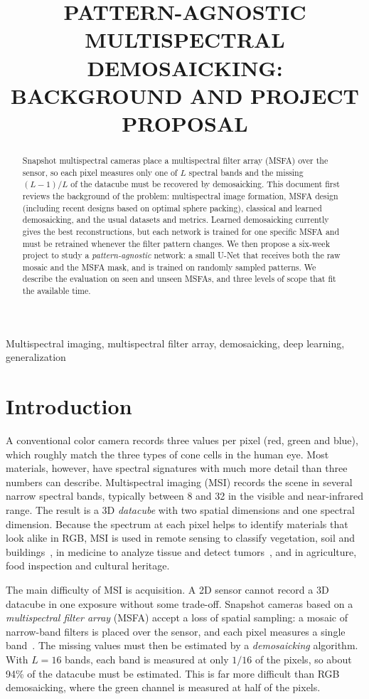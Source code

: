 \documentclass{article}
\title{PATTERN-AGNOSTIC MULTISPECTRAL DEMOSAICKING:\\
  BACKGROUND AND PROJECT PROPOSAL}
\begin{document}
%
\maketitle
%
\begin{abstract}
Snapshot multispectral cameras place a multispectral filter array (MSFA) over
the sensor, so each pixel measures only one of $L$ spectral bands and the
missing $(L-1)/L$ of the datacube must be recovered by demosaicking. This
document first reviews the background of the problem: multispectral image
formation, MSFA design (including recent designs based on optimal sphere
packing), classical and learned demosaicking, and the usual datasets and
metrics. Learned demosaicking currently gives the best reconstructions, but
each network is trained for one specific MSFA and must be retrained whenever
the filter pattern changes. We then propose a six-week project to study a
\emph{pattern-agnostic} network: a small U-Net that receives both the raw
mosaic and the MSFA mask, and is trained on randomly sampled patterns. We
describe the evaluation on seen and unseen MSFAs, and three levels of scope
that fit the available time.
\end{abstract}
%
\begin{keywords}
Multispectral imaging, multispectral filter array, demosaicking, deep
learning, generalization
\end{keywords}
%
\section{Introduction}
\label{sec:intro}

A conventional color camera records three values per pixel (red, green and
blue), which roughly match the three types of cone cells in the human eye.
Most materials, however, have spectral signatures with much more detail than
three numbers can describe. Multispectral imaging (MSI) records the scene in
several narrow spectral bands, typically between 8 and 32 in the visible and
near-infrared range. The result is a 3D \emph{datacube} with two spatial
dimensions and one spectral dimension. Because the spectrum at each pixel
helps to identify materials that look alike in RGB, MSI is used in remote
sensing to classify vegetation, soil and buildings~\cite{diaz2023}, in
medicine to analyze tissue and detect tumors~\cite{lu2014}, and in
agriculture, food inspection and cultural heritage.

The main difficulty of MSI is acquisition. A 2D sensor cannot record a 3D
datacube in one exposure without some trade-off. Snapshot cameras based on a
\emph{multispectral filter array} (MSFA) accept a loss of spatial sampling: a
mosaic of narrow-band filters is placed over the sensor, and each pixel
measures a single band~\cite{lapray2014}. The missing values must then be
estimated by a \emph{demosaicking} algorithm. With $L=16$ bands, each band is
measured at only $1/16$ of the pixels, so about 94\% of the datacube must be
estimated. This is far more difficult than RGB demosaicking, where the green
channel is measured at half of the pixels.
\end{document}
